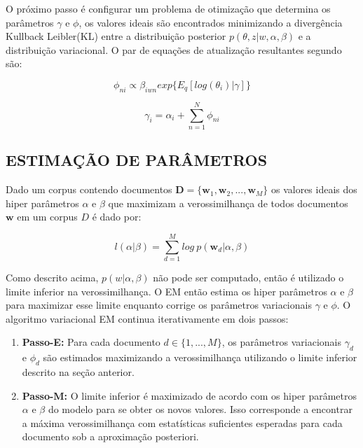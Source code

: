 \documentclass[12pt,a4paper]{article}
\begin{document}
O próximo passo é configurar um problema de otimização que determina os parâmetros $\gamma$ e $\phi$, os valores ideais são encontrados minimizando a divergência Kullback Leibler(KL) entre a distribuição posterior $p(\theta, z|w,\alpha,\beta)$ e a distribuição variacional. O par de equações de atualização resultantes segundo  são:

\begin{equation}
\phi_{ni} \propto \beta_{iwn} exp\{E_q[log(\theta_i)|\gamma]\}
\end{equation}

\begin{equation}
\gamma_i = \alpha_i + \sum_{n=1}^{N} \phi_{ni}
\end{equation}


\subsection{ESTIMAÇÃO DE PARÂMETROS}
Dado um corpus contendo documentos $\textbf{D} = \{\textbf{w}_1, \textbf{w}_2, . . ., \textbf{w}_M\}$ os valores ideais dos hiper parâmetros $\alpha$ e $\beta$ que maximizam a verossimilhança de todos documentos $\textbf{w}$ em um corpus $D$ é dado por:

\begin{equation}
l(\alpha|\beta) = \sum_{d=1}^{M} log\ p(\textbf{w}_d|\alpha,\beta)
\end{equation}

Como descrito acima, $p(w|\alpha,\beta)$ não pode ser computado, então é utilizado o limite inferior na verossimilhança. O EM então estima os hiper parâmetros $\alpha$ e $\beta$ para maximizar esse limite enquanto corrige os parâmetros variacionais $\gamma$ e $\phi$. O algoritmo variacional EM continua iterativamente em dois passos:

\begin{enumerate}
\item \textbf{Passo-E:} Para cada documento $d \in \{1,. . . , M\}$, os parâmetros variacionais $\gamma_d$ e $\phi_d$ são estimados maximizando a verossimilhança utilizando o limite inferior descrito na seção anterior.
\item \textbf{Passo-M:} O limite inferior é maximizado  de acordo com os hiper parâmetros $\alpha$ e $\beta$ do modelo para se obter os novos valores. Isso corresponde a encontrar a máxima verossimilhança com estatísticas suficientes esperadas para cada documento sob a aproximação posteriori.
\end{enumerate}
\end{document}

